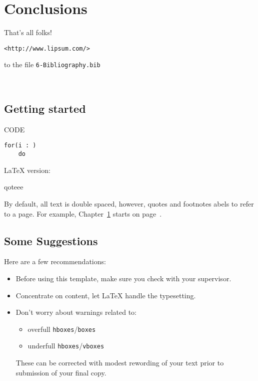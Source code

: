 \chapter{Conclusions}
\label{chap:conclusions}
That's all folks!

\begin{center}
\texttt{<http://www.lipsum.com/>}
\end{center}

to the file \texttt{6-Bibliography.bib}

~\cite{res1}
~\cite{res2}
~\cite{res3}
~\cite{res4}
~\cite{res5}
~\cite{res6}
~\cite{res7}
~\cite{res8}
~\cite{res9}
~\cite{res10}
~\cite{res11}
~\cite{res12}
~\cite{res13}
~\cite{res14}
~\cite{res15}
~\cite{res16}
~\cite{res17}
~\cite{res18}
~\cite{res19}
~\cite{res20}
~\cite{res21}
~\cite{res22}

\section{Getting started}

CODE

\begin{verbatim}
for(i : )
    do
\end{verbatim}

\LaTeX{} version:

\begin{munquote}%
qoteee%
\end{munquote}



By default, all text is double spaced, however, quotes and footnotes
abels to refer to a page.  For example, Chapter~\ref{chap:conclusions}
starts on page~\pageref{chap:conclusions}.

\section{Some Suggestions}

Here are a few recommendations:

\begin{itemize}
	\item Before using this template, make sure you check with
		your supervisor.
	\item Concentrate on content, let \LaTeX{} handle the typesetting.
	\item Don't worry about warnings related to:
	\begin{itemize}
		\item overfull \texttt{hboxes}/\texttt{boxes}
		\item underfull \texttt{hboxes}/\texttt{vboxes}
	\end{itemize}
	These can be corrected with modest rewording of your text prior
	to submission of your final copy.
\end{itemize}

